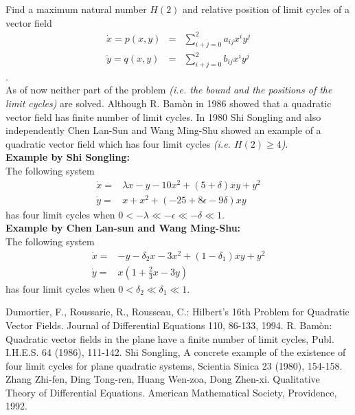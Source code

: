 \documentclass[12pt]{article}
\begin{document}
Find a maximum natural number $H(2)$ and relative position of limit cycles of a vector field
\begin{eqnarray*}
\dot{x} = p(x,y) &=&\sum_{i+j=0}^2 a_{ij}x^iy^j \\
\dot{y} = q(x,y) &=& \sum_{i+j=0}^2 b_{ij}x^iy^j
\end{eqnarray*}
\cite{1}.\\
As of now neither part of the problem \textit{(i.e. the bound and the positions of the limit cycles)} are solved.  Although R. Bam\`on in 1986 showed \cite{2} that a quadratic vector field has finite number of limit cycles.  In 1980 Shi Songling \cite{3} and also independently Chen Lan-Sun and Wang Ming-Shu \cite{4} showed an example of a quadratic vector field which has four limit cycles \textit{(i.e. $H(2)\geq 4$)}.\\

\textbf{Example by Shi Songling:}\\
The following system
\begin{eqnarray*}
\dot{x}=& \lambda x - y - 10x^2 + (5+\delta)xy + y^2 \\
\dot{y}=& x + x^2 + (-25 + 8\epsilon - 9\delta)xy
\end{eqnarray*}
has four limit cycles when $0<-\lambda\ll -\epsilon\ll- \delta\ll 1$. \cite{4}\\

\textbf{Example by Chen Lan-sun and Wang Ming-Shu:}\\
The following system
\begin{eqnarray*}
\dot{x}=& -y -\delta_2x - 3x^2 + (1-\delta_1)xy + y^2\\
\dot{y}=& x(1+\frac{2}{3}x - 3y)
\end{eqnarray*}
has four limit cycles when $0<\delta_2\ll\delta_1\ll 1$. \cite{4}

\begin{thebibliography}{1}
 Dumortier, F., Roussarie, R., Rousseau, C.: Hilbert's 16th Problem for Quadratic Vector Fields. Journal of Differential Equations 110, 86-133, 1994.
 R. Bam\`on: Quadratic vector fields in the plane have a finite number of limit cycles, Publ. I.H.E.S. 64 (1986), 111-142.
 Shi Songling, A concrete example of the existence of four limit cycles for plane quadratic systems, Scientia Sinica 23 (1980), 154-158.
 Zhang Zhi-fen, Ding Tong-ren, Huang Wen-zoa, Dong Zhen-xi.  Qualitative Theory of Differential Equations.  American Mathematical Society, Providence, 1992.
\end{thebibliography}
\end{document}
